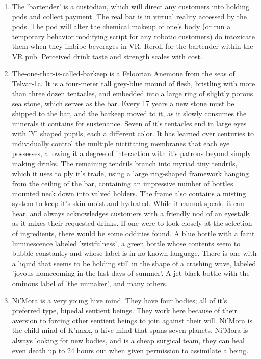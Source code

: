 \documentclass{article}
\begin{document}
\begin{enumerate}
	\item The 'bartender' is a custodian, which will direct any customers into holding pods and collect payment. The real bar is in virtual reality accessed by the pods. The pod will alter the chemical makeup of one's body (or run a temporary behavior modifying script for any robotic customers) do intoxicate them when they imbibe beverages in VR. Reroll for the bartender within the VR pub. Perceived drink taste and strength scales with cost.
	\item The-one-that-is-called-barkeep is a Feloorian Anemone from the seas of Telvar-1c. It is a four-meter tall grey-blue mound of flesh, bristling with more than three dozen tentacles, and embedded into a large ring of slightly porous sea stone, which serves as the bar. Every 17 years a new stone must be shipped to the bar, and the barkeep moved to it, as it slowly consumes the minerals it contains for sustenance. Seven of it's tentacles end in large eyes with 'Y' shaped pupils, each a different color. It has learned over centuries to individually control the multiple nictitating membranes that each eye possesses, allowing it a degree of interaction with it's patrons beyond simply making drinks. The remaining tendrils branch into myriad tiny tendrils, which it uses to ply it's trade, using a large ring-shaped framework hanging from the ceiling of the bar, containing an impressive number of bottles mounted neck down into valved holders. The frame also contains a misting system to keep it's skin moist and hydrated. While it cannot speak, it can hear, and always acknowledges customers with a friendly nod of an eyestalk as it mixes their requested drinks. If one were to look closely at the selection of ingredients, there would be some oddities found. A blue bottle with a faint luminescence labeled 'wistfulness', a green bottle whose contents seem to bubble constantly and whose label is in no known language. There is one with a liquid that seems to be holding still in the shape of a crashing wave, labeled 'joyous homecoming in the last days of summer'. A jet-black bottle with the ominous label of 'the unmaker', and many others.
	\item Ni'Mora is a very young hive mind. They have four bodies; all of it's preferred type, bipedal sentient beings. They work here because of their aversion to forcing other sentient beings to join against their will. Ni'Mora is the child-mind of K'naxx, a hive mind that spans seven planets. Ni'Mora is always looking for new bodies, and is a cheap surgical team, they can heal even death up to 24 hours out when given permission to assimilate a being.

\end{enumerate}
\end{document}
